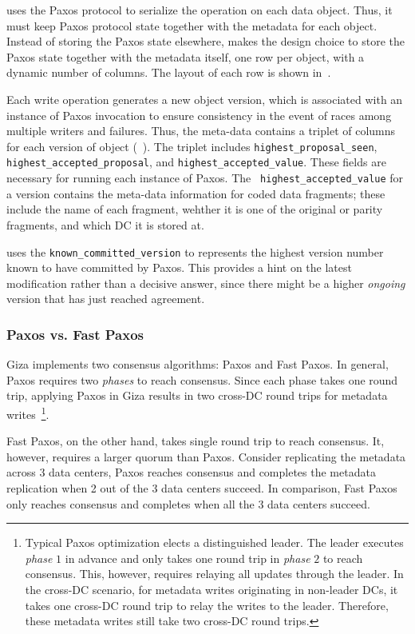 \name uses the Paxos protocol to serialize the operation on each data object.  Thus, it 
must keep Paxos protocol state together with the metadata for each object. Instead of storing the Paxos state elsewhere, {\name} makes the design
choice to store the Paxos state together with the metadata itself,
one row per object, with a dynamic number of columns. The layout of each row is
shown in~.  

Each \name write operation generates a new
object version, which is associated with an instance of Paxos invocation to
ensure consistency in the event of races among multiple writers and failures.
Thus, the meta-data contains a triplet of columns for each version of object
(~). The triplet includes {\tt highest\_proposal\_seen},
{\tt highest\_accepted\_proposal}, and {\tt highest\_accepted\_value}.  These
fields are necessary for running each instance of Paxos.  The {\tt
highest\_accepted\_value} for a version contains the meta-data information for
coded data fragments; these include the name of each fragment, wehther it is
one of the original or parity fragments, and which DC it is stored at. 

{\name} uses the {\tt known\_committed\_version} to represents the highest 
version number known to have committed by Paxos.  This provides a hint on the latest 
modification rather than a decisive answer, since there might be a higher
\emph{ongoing} version that has just reached agreement.  

\subsubsection{Paxos vs. Fast Paxos}

Giza implements two consensus algorithms: Paxos and Fast Paxos. In general, Paxos requires two {\em phases} to reach consensus. Since each phase takes one round trip, applying Paxos in Giza results in two cross-DC round trips for metadata writes~\footnote{Typical Paxos optimization elects a distinguished leader. The leader executes {\em phase} $1$ in advance and only takes one round trip in {\em phase} $2$ to reach consensus. This, however, requires relaying all updates through the leader. In the cross-DC scenario, for metadata writes originating in non-leader DCs, it takes one cross-DC round trip to relay the writes to the leader. Therefore, these metadata writes still take two cross-DC round trips.}.

Fast Paxos, on the other hand, takes single round trip to reach consensus. It, however, requires a larger quorum than Paxos. Consider replicating the metadata across $3$ data centers, Paxos reaches consensus and completes the metadata replication when 2 out of the 3 data centers succeed. In comparison, Fast Paxos only reaches consensus and completes when all the 3 data centers succeed.

